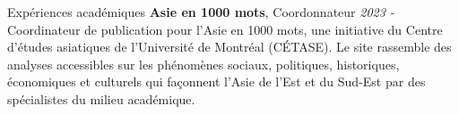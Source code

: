 \documentclass{resume} %
\begin{document}
\begin{rSection}{Expériences académiques}
{\bf Asie en 1000 mots}{, Coordonnateur} \hfill {\em 2023 - }\\
Coordinateur de publication pour l'Asie en 1000 mots, une initiative du Centre d'études asiatiques de l'Université de Montréal (CÉTASE). Le site rassemble des analyses accessibles sur les phénomènes sociaux, politiques, historiques, économiques et culturels qui façonnent l'Asie de l'Est et du Sud-Est par des spécialistes du milieu académique. 

\clearpage


\end{rSection}
\end{document}
